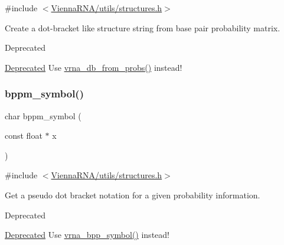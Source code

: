 {\ttfamily \#include $<$\mbox{\hyperlink{utils_2structures_8h}{Vienna\+R\+N\+A/utils/structures.\+h}}$>$}



Create a dot-\/bracket like structure string from base pair probability matrix. 

\begin{DoxyRefDesc}{Deprecated}
\item[\mbox{\hyperlink{deprecated__deprecated000210}{Deprecated}}]Use \mbox{\hyperlink{group__struct__utils_ga0c28c410a5ab22d6ab9c77a84e8d5b44}{vrna\+\_\+db\+\_\+from\+\_\+probs()}} instead!\end{DoxyRefDesc}
\mbox{\label{group__struct__utils__deprecated_ga49962ad6242b8c628de6ca16bb831c1d}} 
\subsubsection{\texorpdfstring{bppm\_symbol()}{bppm\_symbol()}}
{\footnotesize\ttfamily char bppm\+\_\+symbol (\begin{DoxyParamCaption}\item[{const float $\ast$}]{x }\end{DoxyParamCaption})}



{\ttfamily \#include $<$\mbox{\hyperlink{utils_2structures_8h}{Vienna\+R\+N\+A/utils/structures.\+h}}$>$}



Get a pseudo dot bracket notation for a given probability information. 

\begin{DoxyRefDesc}{Deprecated}
\item[\mbox{\hyperlink{deprecated__deprecated000211}{Deprecated}}]Use \mbox{\hyperlink{group__struct__utils_ga025bff1b27fa46534c8fae6980f64bb5}{vrna\+\_\+bpp\+\_\+symbol()}} instead!\end{DoxyRefDesc}
